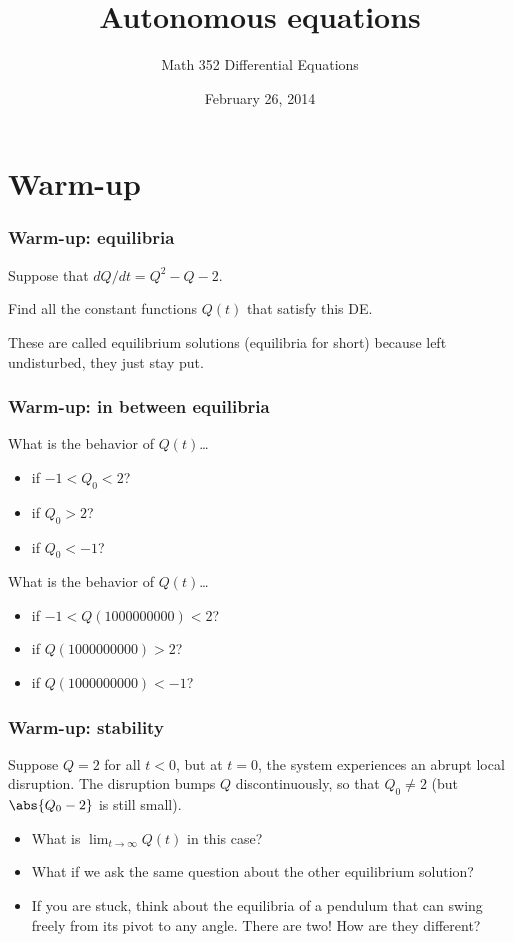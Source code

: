 \documentclass[11pt,ignorenonframetext,]{beamer}
\title{Autonomous equations}
\author{Math 352 Differential Equations}
\date{February 26, 2014}
\begin{document}
\frame{\titlepage}

\section{Warm-up}

\begin{frame}\frametitle{Warm-up: equilibria}

Suppose that $dQ/dt = Q^2 - Q - 2$.

Find all the constant functions $Q(t)$ that satisfy this DE.

These are called equilibrium solutions (equilibria for short) because
left undisturbed, they just stay put.

\end{frame}

\begin{frame}\frametitle{Warm-up: in between equilibria}

What is the behavior of $Q(t)$\ldots{}

\begin{itemize}
\itemsep1pt\parskip0pt
\item
  if $-1 < Q_0 < 2$?
\item
  if $Q_0 > 2$?
\item
  if $Q_0 < -1$?
\end{itemize}

What is the behavior of $Q(t)$\ldots{}

\begin{itemize}
\itemsep1pt\parskip0pt
\item
  if $-1 < Q(1000000000) < 2$?
\item
  if $Q(1000000000) > 2$?
\item
  if $Q(1000000000) < -1$?
\end{itemize}

\end{frame}

\begin{frame}\frametitle{Warm-up: stability}

Suppose $Q = 2$ for all $t < 0$, but at $t = 0$, the system experiences
an abrupt local disruption. The disruption bumps $Q$ discontinuously, so
that $Q_0 \ne 2$ (but $\abs{Q_0 - 2}$ is still small).

\begin{itemize}[<+->]
\itemsep1pt\parskip0pt
\item
  What is $\lim_{t\to\infty} Q(t)$ in this case?
\item
  What if we ask the same question about the other equilibrium solution?
\item
  If you are stuck, think about the equilibria of a pendulum that can
  swing freely from its pivot to any angle. There are two! How are they
  different?
\end{itemize}

\end{frame}
\end{document}
